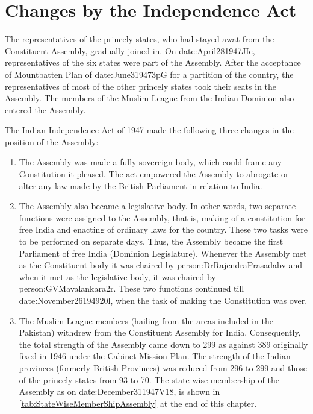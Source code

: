 \section{Changes by the Independence Act}

The representatives of the princely states, who had stayed awat from the Constituent Assembly, gradually joined in. On \gls{date:April281947JIe}, representatives of the six states were part of the Assembly. After the acceptance of Mountbatten Plan of \gls{date:June319473pG} for a partition of the country, the representatives of most of the other princely states took their seats in the Assembly. The members of the Muslim League from the Indian Dominion also entered the Assembly.

The Indian Independence Act of 1947 made the following three changes in the position of the Assembly:

\begin{enumerate}
  \item The Assembly was made a fully sovereign body, which could frame any Constitution it pleased. The act empowered the Assembly to abrogate or alter any law made by the British Parliament in relation to India.
  \item The Assembly also became a legislative body. In other words, two separate functions were assigned to the Assembly, that is, making of a constitution for free India and enacting of ordinary laws for the country. These two tasks were to be performed on separate days. Thus, the Assembly became the first Parliament of free India (Dominion Legislature). Whenever the Assembly met as the Constituent body it was chaired by \gls{person:DrRajendraPrasadabv} and when it met as the legislative body, it was chaired by \gls{person:GVMavalankara2r}. These two functions continued till \gls{date:November26194920l}, when the task of making the Constitution was over.
  \item The Muslim League members (hailing from the areas included in the Pakistan) withdrew from the Constituent Assembly for India. Consequently, the total strength of the Assembly came down to 299 as against 389 originally fixed in 1946 under the Cabinet Mission Plan. The strength of the Indian provinces (formerly British Provinces) was reduced from 296 to 299 and those of the princely states from 93 to 70. The state-wise membership of the Assembly as on \gls{date:December311947V18}, is shown in \ref{tab:StateWiseMemberShipAssembly} at the end of this chapter.
\end{enumerate}

